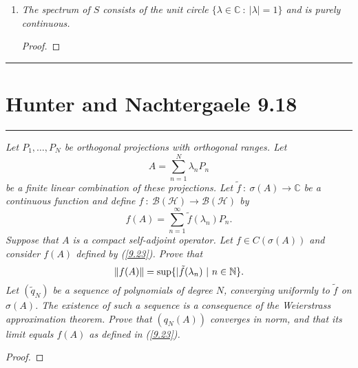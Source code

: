 \documentclass{article} %
\theoremstyle{plain}
\def\Cx{\mathbb{C}}
\newcommand{\Hilb}{\mathcal{H}}
\newcommand{\problem}[1]{
\vspace{.375cm}
\begin{minipage}{\textwidth}
    \begin{center}
        \noindent\rule{5cm}{1pt}
    \end{center}
    \section{\bf #1}
    \begin{center}
        \noindent\rule{5cm}{1pt}
    \end{center}
    \vspace{0.25cm}
\end{minipage}
}
\numberwithin{equation}{section} %
\numberwithin{figure}{section} %
\numberwithin{table}{section} %
\begin{document}
\begin{enumerate}[\it a)]
\begin{proof}
            \begin{align*}
                \mathcal{F}(S(y)_n) = \tilde{S}\qty(\sum_{n\in\mathbb{Z}} a_n e^{inx}) = e^{ix}\sum_{n\in\mathbb{Z}}a_ne^{inx} = \sum_{n\in\mathbb{Z}}a_ne^{i(n+1)x}
            \end{align*}
            where $\tilde{S}$ is the shift operator in $L^2(\mathbb{T})$ ($\tilde{S} = \mathcal{F}\circ S$).
            Let $|\lambda| < 1$.  Then $\qty(\tilde{S} - \lambda I)g = \sum_{n\in\mathbb{Z}}a_ne^{inx}$ where $g$ is defined as
            \begin{align*}
                g = \frac{\sum_{n\in\mathbb{Z}}a_n e^{inx}}{e^{ix} - \lambda}
            \end{align*}
            since
            \begin{align*}
                \qty(\tilde{S} - \lambda I)\qty(\frac{\sum_{n\in\mathbb{Z}}a_n e^{inx}}{e^{ix} - \lambda}) = \frac{e^{ix}\sum_{n\in\mathbb{Z}}a_n e^{inx} - \lambda\sum_{n\in\mathbb{Z}}a_n e^{inx}}{e^{ix} - \lambda} = \sum_{n\in\mathbb{Z}}a_n e^{inx}
            \end{align*}
            Thus $(\tilde{S} - \lambda I)$ is surjective, which shows $(S - \lambda I)$ is surjective.
        \end{proof}
    \item
        \emph{The spectrum of $S$ consists of the unit circle $\{\lambda \in \Cx\ :\ |\lambda| = 1\}$ and is purely continuous.}
        \begin{proof}
        \end{proof}
\end{enumerate}









\problem{Hunter and Nachtergaele 9.18}
\emph{Let $P_1, \dots, P_N$ be orthogonal projections with orthogonal ranges.  Let $$A = \sum_{n=1}^N\lambda_n P_n$$ be a finite linear combination of these projections.  Let $\tilde{f}\ :\ \sigma(A) \rightarrow \Cx$ be a continuous function and define $f\ :\ \mathcal{B}(\Hilb) \rightarrow \mathcal{B}(\Hilb)$ by}
\begin{equation}
    \tag{9.23}
    f(A) = \sum_{n=1}^\infty \tilde{f}(\lambda_n)P_n.
    \label{9.23}
\end{equation}
\emph{Suppose that $A$ is a compact self-adjoint operator.  Let $f \in C(\sigma(A))$ and consider $f(A)$ defined by (\ref{9.23}).  Prove that $$\norm{f(A)} = \sup\{|\tilde{f}(\lambda_n)\ |\ n \in \mathbb{N}\}.$$  Let $(\tilde{q}_N)$ be a sequence of polynomials of degree $N$, converging uniformly to $\tilde{f}$ on $\sigma(A)$.  The existence of such a sequence is a consequence of the Weierstrass approximation theorem.  Prove that $(q_N(A))$ converges in norm, and that its limit equals $f(A)$ as defined in (\ref{9.23}).}
\begin{proof}
\end{proof}
\end{document}
